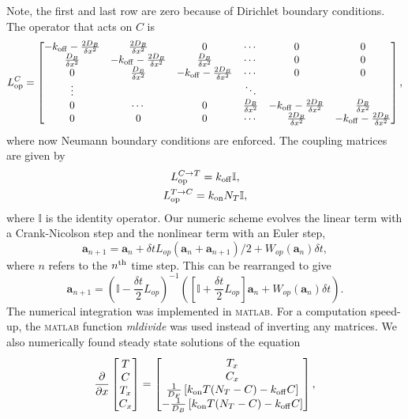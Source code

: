 %
Note, the first and last row are zero because of Dirichlet boundary conditions.
The operator that acts on $C$ is
%
\begin{equation}
L^{C}_{\mathrm{op}} =
\begin{bmatrix}
  -k_{\rm off} -\frac{2 D_B}{\delta x^2} &
  \frac{2D_B}{\delta x^2} & 0 &\cdots & 0 & 0\\
  \frac{D_B}{\delta x^2} &-k_{\rm off} -\frac{2 D_B}{\delta x^2} &
  \frac{D_B}{\delta x^2} & \cdots & 0 & 0\\
  0 & \frac{D_B}{\delta x^2} & -k_{\rm off} -\frac{2 D_B}{\delta x^2} &  \cdots & 0 & 0\\
  \vdots & & &\ddots & \\
  0 & \cdots & 0 & \frac{D_B}{\delta x^2} & -k_{\rm off} -\frac{2 D_B}{\delta x^2}  & \frac{D_B}{\delta x^2}\\
  0 & 0 & 0 & \cdots & \frac{2 D_B}{\delta x^2} & -k_{\rm off} -\frac{2 D_B}{\delta x^2} \\
\end{bmatrix},
\end{equation}
where now Neumann boundary conditions are enforced. The coupling matrices are
given by
\begin{gather}
  L^{C\rightarrow T}_{\mathrm{op}} = k_{\rm off} \mathbb{I}, \\
  L^{T\rightarrow C}_{\mathrm{op}} = k_{\rm on} N_T \mathbb{I},
\end{gather}
%
where $\mathbb{I}$ is the identity operator.  Our numeric scheme evolves the
linear term with a Crank-Nicolson step and the nonlinear term with an Euler
step,
%
\begin{equation}
  \bm{a}_{n+1} = \bm{a}_n + \delta t L_{op} (\bm{a}_n + \bm{a}_{n+1})/2 
  + W_{op}(\bm{a}_n) \delta t,
\end{equation}
%
where $n$ refers to the $n^{\mathrm{th}}$ time step.  This can be rearranged to give
%
\begin{equation}
  \bm{a}_{n+1} = {\left(\mathbb{I} - \frac{\delta t}{2} L_{op}\right)}^{-1}
  \left( \left[\mathbb{I} + \frac{\delta t}{2} L_{op}\right] \bm{a}_n 
  + W_{op}(\bm{a}_n) \delta t \right).
\end{equation}
%
The numerical integration was implemented in \textsc{matlab}. For a computation
speed-up, the \textsc{matlab} function \textit{mldivide} was used instead of
inverting any matrices.  We also numerically found steady state solutions of the
equation
%
\begin{equation}
  \label{eqn:ode}
  \frac{\partial}{\partial x}
  \begin{bmatrix}
    T \\
    C \\
    T_x \\
    C_x 
  \end{bmatrix}
  =
  \begin{bmatrix}
    T_x  \\
    C_x \\
    \frac{1}{D_F} \left[ k_{\rm on} T ( N_T - C ) - k_{\rm off} C  \right] \\
    -\frac{1}{D_B} \left[ k_{\rm on} T ( N_T - C ) - k_{\rm off} C  \right] \\
  \end{bmatrix},
\end{equation}
